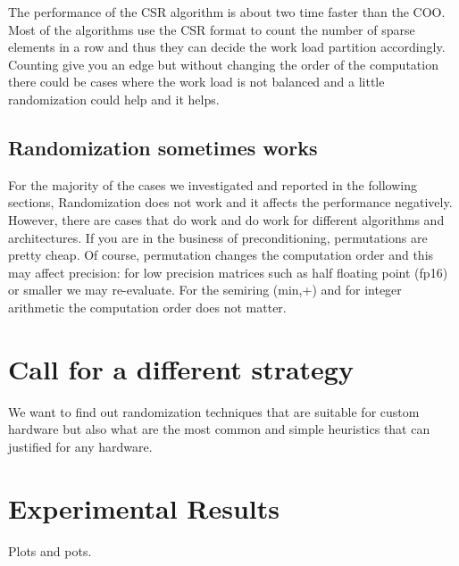 \documentclass[manuscript,screen]{acmart}
\begin{document}
The performance of the CSR algorithm is about two time faster than the
COO. Most of the algorithms use the CSR format to count the number of
sparse elements in a row and thus they can decide the work load
partition accordingly. Counting give you an edge but without changing
the order of the computation there could be cases where the work load
is not balanced and a little randomization could help and it helps.

\subsection{Randomization sometimes works}

For the majority of the cases we investigated and reported in the
following sections, Randomization does not work and it affects the
performance negatively. However, there are cases that do work and do
work for different algorithms and architectures. If you are in the
business of preconditioning, permutations are pretty cheap. Of course,
permutation changes the computation order and this may affect
precision: for low precision matrices such as half floating point
(fp16) or smaller we may re-evaluate. For the semiring (min,+) and for
integer arithmetic the computation order does not matter.



\section{Call for a different strategy}
\label{sec:strategy}
We want to find out randomization techniques that are suitable for
custom hardware but also what are the most common and simple
heuristics that can justified for any hardware.


\section{Experimental Results}
\label{sec:experimentalresults}
Plots and pots.





%

 

%
\end{document}
